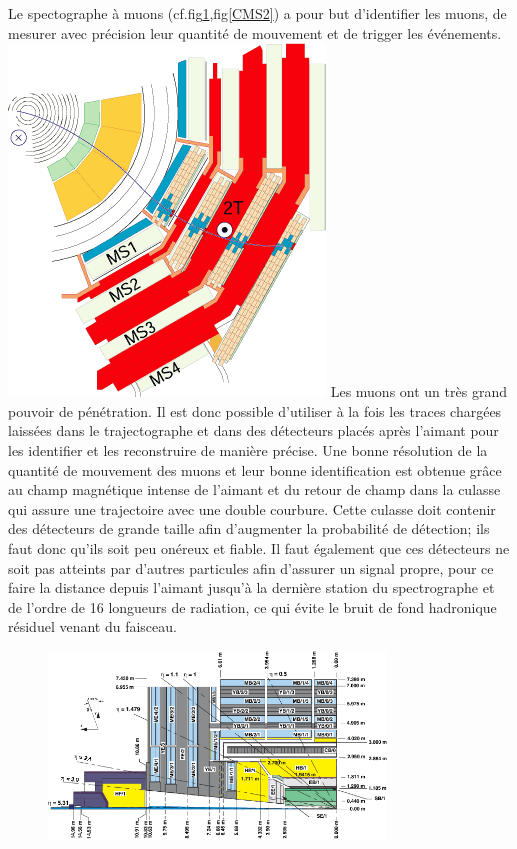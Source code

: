 Le spectographe à muons (cf.fig\ref{CMS1},fig\ref{CMS2}) a pour but d'identifier les muons, de mesurer avec précision leur quantité de mouvement et de trigger les événements.\marginpar
{
	\centering
	\includegraphics[width=\marginparwidth]{CMS/MUON.png}
	\label{MUON}
} Les muons ont un très grand pouvoir de pénétration. Il est donc possible d'utiliser à la fois les traces chargées laissées dans le trajectographe et dans des détecteurs placés après l'aimant pour les identifier et les reconstruire de manière précise. Une bonne résolution de la quantité de mouvement des muons et leur bonne identification est obtenue grâce au champ magnétique intense de l'aimant et du retour de champ dans la culasse qui assure une trajectoire avec une double courbure. Cette culasse doit contenir des détecteurs de grande taille afin d'augmenter la probabilité de détection; ils faut donc qu'ils soit peu onéreux et fiable. Il faut également que ces détecteurs ne soit pas atteints par d'autres particules afin d'assurer un signal propre, pour ce faire la distance depuis l'aimant jusqu'à la dernière station du spectrographe et de l'ordre de 16 longueurs de radiation, ce qui évite le bruit de fond hadronique résiduel venant du faisceau.

\begin{figure}
\centering
\includegraphics[width=0.80\textwidth]{CMS/CMSLONG.png}
\label{CMS1}
\end{figure}


